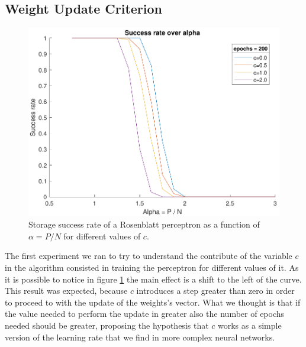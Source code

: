 \subsection{Weight Update Criterion}
\label{subsec:c}
\begin{figure}[t]
	\centering
	\includegraphics[width=\columnwidth]{figures/bonus_2_c}
    \caption{Storage success rate of a Rosenblatt perceptron as a function of $\alpha = P / N$ for different values of $c$.}
	\label{fig:multiple_c}
\end{figure}
The first experiment we ran to try to understand the contribute of the variable $c$ in the algorithm consisted in training the perceptron for different
values of it. As it is possible to notice in figure \ref{fig:multiple_c} the main effect is a shift to the left of the curve. This result was expected, because
$c$ introduces a step greater than zero in order to proceed to with the update of the weights's vector. What we thought is that if the value needed to perform
the update in greater also the number of epochs needed should be greater, proposing the hypothesis that $c$ works as a simple version of the learning rate that
we find in more complex neural networks.

